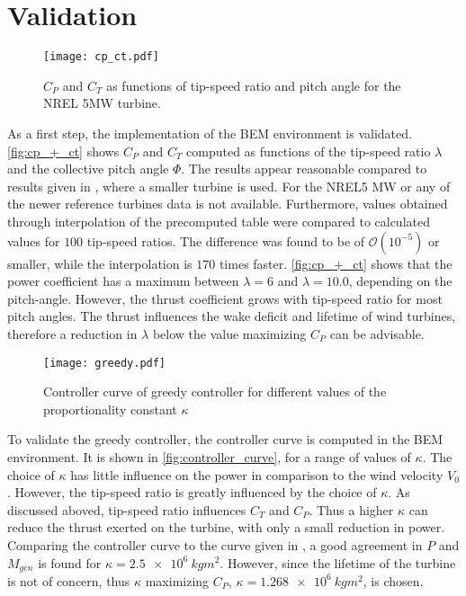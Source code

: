 \section{Validation}
\begin{figure}[h]
	\centering
	\texttt{[image: cp\_ct.pdf]}
	\caption{$C_P$ and $C_T$ as functions of tip-speed ratio and pitch angle for the NREL 5MW turbine.}
	\label{fig:cp_+_ct}
\end{figure}
As a first step, the implementation of the BEM environment is validated. \autoref{fig:cp_+_ct} shows $C_P$ and $C_T$ computed as functions of the tip-speed ratio $\lambda$ and the collective pitch angle $\Phi$. The results appear reasonable compared to results given in \cite{hansen_aerodynamics_2008}, where a smaller turbine is used. For the NREL5 MW or any of the newer reference turbines data is not available. Furthermore, values obtained through interpolation of the precomputed table were compared to calculated values for $100$ tip-speed ratios. The difference was found to be of $\mathcal{O}\left(10^{-5}\right)$ or smaller, while the interpolation is $170$ times faster. \autoref{fig:cp_+_ct} shows that the power coefficient has a maximum between $\lambda=6$ and $\lambda=10.0$, depending on the pitch-angle. However, the thrust coefficient grows with tip-speed ratio for most pitch angles. The thrust influences the wake deficit and lifetime of wind turbines, therefore a reduction in $\lambda$ below the value maximizing $C_P$ can be advisable.\\
\begin{figure}[h]
	\centering
	\texttt{[image: greedy.pdf]}
	\caption{Controller curve of greedy controller for different values of the proportionality constant $\kappa$}
	\label{fig:controller_curve}
\end{figure}
To validate the greedy controller, the controller curve is computed in the BEM environment. It is shown in \autoref{fig:controller_curve}, for a range of values of $\kappa$. The choice of $\kappa$ has little influence on the power in comparison to the wind velocity $V_0$. However, the tip-speed ratio is greatly influenced by the choice of $\kappa$. As discussed aboved, tip-speed ratio influences $C_T$ and $C_P$. Thus a higher $\kappa$ can reduce the thrust exerted on the turbine, with only a small reduction in power. Comparing the controller curve to the curve given in \cite{jonkman_definition_2009}, a good agreement in $P$ and $M_{gen}$ is found for $\kappa=\SI{2.5e6}{kgm^2}$. However, since the lifetime of the turbine is not of concern, thus $\kappa$ maximizing $C_P$,  $\kappa = \SI{1.268e6}{kgm^2}$, is chosen. \\
